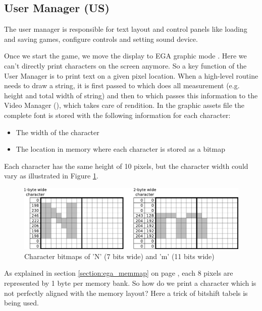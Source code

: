 \documentclass[book.tex]{subfiles}
\begin{document}
\par

\par
 
 
 
\subsection{User Manager (US)} 
\label{section:bitshifting}
The user manager is responsible for text layout and control panels like loading and saving games, configure controls and setting sound device.\\
\par

Once we start the game, we move the display to EGA graphic mode . Here we can't directly print characters on the screen anymore. So a key function of the User Manager is to print text on a given pixel location. When a high-level routine needs to draw a string, it is first passed to  which does all measurement (e.g. height and total width of string) and then to  which passes this information to the Video Manager (), which takes care of rendition.
In the graphic assets file the complete font is stored with the following information for each character:
\begin{itemize}
  \item The width of the character
  \item The location in memory where each character is stored as a bitmap
\end{itemize}
Each character has the same height of 10 pixels, but the character width could vary as illustrated in Figure \ref{fig:text_bitmap}. 
\begin{figure}[H]
\centering
 \includegraphics[width=\textwidth]{imgs/drawings/text_bitmap.eps}
 \caption{Character bitmaps of 'N' (7 bits wide) and 'm' (11 bits wide)}
 \label{fig:text_bitmap}
 \end{figure}
 \par
 
As explained in section \ref{section:ega_memmap} on page \pageref{section:ega_memmap}, each 8 pixels are represented by 1 byte per memory bank. So how do we print a character which is not perfectly aligned with the memory layout? Here a trick of bitshift tabels is being used. \\
\par
\end{document}
